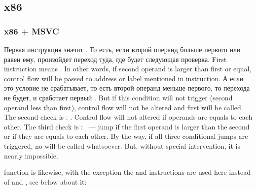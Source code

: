 ﻿\subsection{x86}

\subsubsection{x86 + MSVC}




\IFRU
{Первая инструкция \JLE значит . То есть, если второй операнд больше первого или 
равен ему, произойдет переход туда, где будет следующая проверка.}
{First instruction \JLE means . In other words, if second operand is 
larger than first or equal, control flow will be passed to address or label mentioned in instruction.}
\IFRU
{А если это условие не срабатывает, то есть второй операнд меньше первого, то перехода не будет, 
и сработает первый \printf.}
{But if this condition will not trigger (second operand less than first), control flow will 
not be altered and first \printf will be called.}
{The second check is \JNE: . Control flow will not altered if operands are 
equals to each other.}
{The third check is \JGE:  ~--- jump if the first operand is larger 
than the second or if they are equals to each other.}
{By the way, if all three conditional jumps are triggered, no \printf will be called whatsoever. 
But, without special intervention, it is nearly impossible.}

 
{function is likewise, with the exception the \JBE and \JAE instructions
are used here instead of 
\JLE and \JGE, see below about it:}

